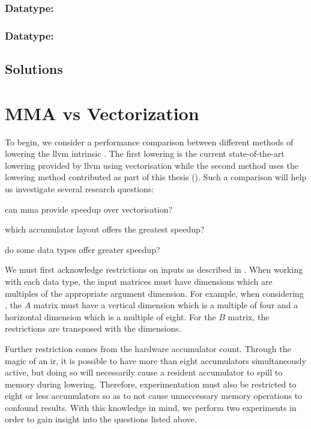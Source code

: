 \documentclass[\main/thesis.tex]{subfiles}
\begin{document}
\subsubsection{Datatype: \texorpdfstring{}{i8}}

\subsubsection{Datatype: \texorpdfstring{}{i4}}

\subsection{Solutions}

\section{MMA vs Vectorization}
\label{sec:mmaVsVec}
To begin, we consider a performance comparison between different methods of \gls{lowering} the \gls{llvm} intrinsic .
The first lowering is the current state-of-the-art lowering provided by \gls{llvm} using \gls{vectorisation} while the second method uses the \gls{lowering} method contributed as part of this thesis ().
Such a comparison will help us investigate several research questions:
\begin{enumerate*}[itemjoin*={{ and }}, label=\textbf{(\arabic*)}]
  \item can \gls{mma} provide speedup over \gls{vectorisation}?
  \item which accumulator layout offers the greatest speedup?
  \item do some data types offer greater speedup?
\end{enumerate*}

We must first acknowledge restrictions on inputs as described in .
When working with each data type, the input matrices must have dimensions which are multiples of the appropriate argument dimension.
For example, when considering , the $A$ matrix must have a vertical dimension which is a multiple of four and a horizontal dimension which is a multiple of eight.
For the $B$ matrix, the restrictions are transposed with the dimensions.

Further restriction comes from the hardware accumulator count.
Through the magic of an \gls{ir}, it is possible to have more than eight accumulators simultaneously active, but doing so will necessarily cause a resident accumulator to \gls{spill} to memory during \gls{lowering}.
Therefore, experimentation must also be restricted to eight or less accumulators so as to not cause unneccessary memory operations to confound results.
With this knowledge in mind, we perform two experiments in order to gain insight into the questions listed above.
\end{document}
